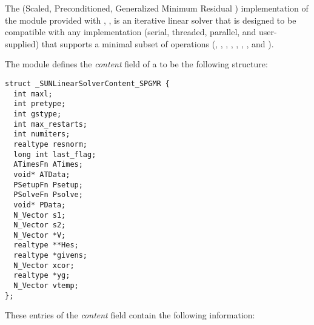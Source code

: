 
The {\spgmr} (Scaled, Preconditioned, Generalized Minimum
Residual \cite{SaSc:86}) implementation of the {\sunlinsol} module
provided with {\sundials}, {\sunlinsolspgmr}, is an iterative linear
solver that is designed to be compatible with any {\nvector}
implementation (serial, threaded, parallel, and user-supplied) that
supports a minimal subset of operations (, 
, , , ,
, , and ).  

The {\sunlinsolspgmr} module defines the {\em content} field of a
 to be the following structure:
\begin{verbatim} 
struct _SUNLinearSolverContent_SPGMR {
  int maxl;
  int pretype;
  int gstype;
  int max_restarts;
  int numiters;
  realtype resnorm;
  long int last_flag;
  ATimesFn ATimes;
  void* ATData;
  PSetupFn Psetup;
  PSolveFn Psolve;
  void* PData;
  N_Vector s1;
  N_Vector s2;
  N_Vector *V;
  realtype **Hes;
  realtype *givens;
  N_Vector xcor;
  realtype *yg;
  N_Vector vtemp;
};
\end{verbatim}
These entries of the \emph{content} field contain the following
information:
